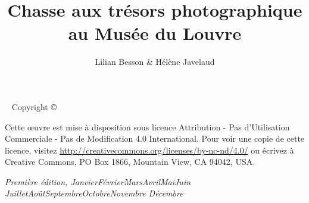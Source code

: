 \documentclass[a4-paper,11pt]{tufte-book}
\title{Chasse aux trésors photographique au Musée du Louvre}
\author{Lilian Besson \& Hélène Javelaud}
\newcommand{\monthyear}{%
  \ifcase\month\or Janvier\or Février\or Mars\or Avril\or Mai\or Juin\or
  Juillet\or Août\or Septembre\or Octobre\or Novembre\or
  Décembre\fi\space\number\year
}
\newcommand{\blankpage}{\newpage\hbox{}\thispagestyle{empty}\newpage}
\begin{document}


\maketitle


\newpage
\begin{fullwidth}
~\vfill
\thispagestyle{empty}
\setlength{\parindent}{0pt}
\setlength{\parskip}{\baselineskip}
Copyright \copyright\ \the\year\ \thanklessauthor


\par Cette œuvre est mise à disposition sous licence Attribution - Pas d'Utilisation Commerciale - Pas de Modification 4.0 International. Pour voir une copie de cette licence, visitez \url{http://creativecommons.org/licenses/by-nc-nd/4.0/} ou écrivez à Creative Commons, PO Box 1866, Mountain View, CA 94042, USA.

\par\textit{Première édition, \monthyear}
\end{fullwidth}

\tableofcontents




\cleardoublepage




\cleardoublepage




\cleardoublepage


\newpage
\blankpage
\end{document}
